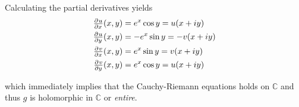 \begin{enumerate}[label = \textbf{Exercise \arabic*.},wide = 0pt, itemsep=1.5ex]
	Calculating the partial derivatives yields
	\begin{align*}
		\pd{u}{x}(x,y) &= e^x\cos y = u(x + iy)\\
		\pd{u}{y}(x,y) &= -e^x\sin y = -v(x + iy)\\
		\pd{v}{x}(x,y) &= e^x\sin y = v(x + iy)\\
		\pd{v}{y}(x,y) &= e^x\cos y = u(x + iy)
	\end{align*}

	\noindent which immediately implies that the Cauchy-Riemann equations holds on $\mathbb{C}$ and thus $g$ is holomorphic in $\mathbb{C}$ or \emph{entire}.

\end{enumerate}
\printbibliography

